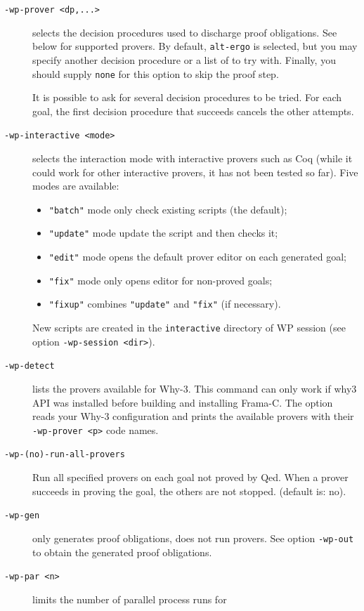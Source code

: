 \begin{description}
\item[\tt -wp-prover <dp,...>] selects the decision procedures used to
  discharge proof obligations. See below for supported provers.  By
  default, \texttt{alt-ergo} is selected, but you may specify another
  decision procedure or a list of to try with.  Finally, you should
  supply \texttt{none} for this option to skip the proof step.

  It is possible to ask for several decision procedures to be tried.
  For each goal, the first decision procedure that succeeds cancels the
  other attempts.
\item[\tt -wp-interactive <mode>] selects the interaction mode with
  interactive provers such as Coq (while it could work for other interactive
  provers, it has not been tested so far). Five modes are available:
  \begin{itemize}
  \item \texttt{"batch"} mode only check existing scripts (the default);
  \item \texttt{"update"} mode update the script and then checks it;
  \item \texttt{"edit"} mode opens the default prover editor on each generated goal;
  \item \texttt{"fix"} mode only opens editor for non-proved goals;
  \item \texttt{"fixup"} combines \texttt{"update"} and \texttt{"fix"} (if necessary).
  \end{itemize}
  New scripts are created in the \texttt{interactive} directory of \textsf{WP}
  session (see option \texttt{-wp-session <dir>}).
\item[\tt -wp-detect] lists the provers available for \textsf{Why-3}.
  This command can only work if \textsf{why3} API was installed before building and
  installing \textsf{Frama-C}.
  The option reads your \textsf{Why-3} configuration and prints the available
  provers with their \verb+-wp-prover <p>+ code names.
\item[\tt -wp-(no)-run-all-provers] Run all specified provers on each goal not
  proved by Qed. When a prover succeeds in proving the goal, the others are not
  stopped. (default is: no).
\item[\tt -wp-gen] only generates proof obligations, does not run provers.
  See option \texttt{-wp-out} to obtain the generated proof obligations.
\item[\tt -wp-par <n>] limits the number of parallel process runs for

\end{description}
